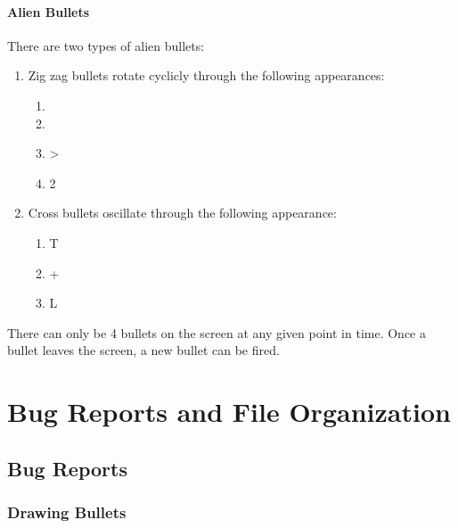 \documentclass[11pt,letter,oneside]{report}
\begin{document}
\subsubsection{Alien Bullets}
There are two types of alien bullets:
\begin{enumerate}
\item{}  Zig zag bullets rotate cyclicly through the following appearances:

\begin{enumerate}
\item 

\item 

\item >
\item 2
\end{enumerate}

\item{}  Cross bullets oscillate through the following appearance:

\begin{enumerate}
\item T
\item +
\item L
\end{enumerate}

\end{enumerate}

There can only be 4 bullets on the screen at any given point in time.  Once a bullet leaves the screen, a new bullet can be fired.

\chapter{Bug Reports and File Organization}

\section{Bug Reports}

\subsection{Drawing Bullets}
\end{document}
